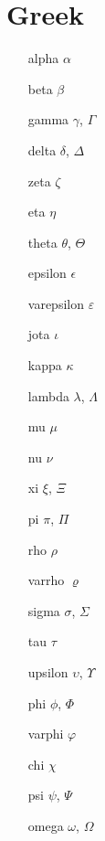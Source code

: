 \documentclass{scrartcl}
\begin{document}
\section{Greek}
\begin{multicols}{3}
\begin{enumerate}[label=\Alph*:]
    \item[alpha] $\alpha$
    \item[beta] $\beta$
    \item[gamma] $\gamma$, $\Gamma$
    \item[delta] $\delta$, $\Delta$
    \item[zeta] $\zeta$
    \item[eta] $\eta$
    \item[theta] $\theta$, $\Theta$
    \item[epsilon] $\epsilon$
    \item[varepsilon] $\varepsilon$
    \item[jota] $\iota$
    \item[kappa] $\kappa$
    \item[lambda] $\lambda$, $\Lambda$
    \item[mu] $\mu$
    \item[nu] $\nu$
    \item[xi] $\xi$, $\Xi$
    \item[pi] $\pi$, $\Pi$
    \item[rho] $\rho$
    \item[varrho] $\varrho$
    \item[sigma] $\sigma$, $\Sigma$
    \item[tau] $\tau$
    \item[upsilon] $\upsilon$, $\Upsilon$
    \item[phi] $\phi$, $\Phi$
    \item[varphi] $\varphi$
    \item[chi] $\chi$
    \item[psi] $\psi$, $\Psi$
    \item[omega] $\omega$, $\Omega$
\end{enumerate}
\end{multicols}
\end{document}
